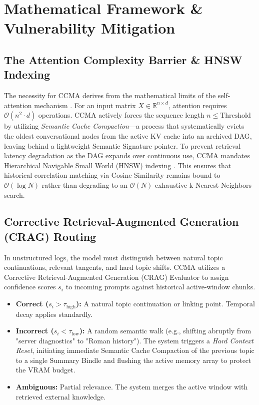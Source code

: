 \documentclass[11pt, a4paper]{article}
\begin{document}
	\section{Mathematical Framework \& Vulnerability Mitigation}
	
	\subsection{The Attention Complexity Barrier \& HNSW Indexing}
	The necessity for CCMA derives from the mathematical limits of the self-attention mechanism \cite{vaswani2017}. For an input matrix $X \in \mathbb{R}^{n \times d}$, attention requires $\mathcal{O}(n^2 \cdot d)$ operations. CCMA actively forces the sequence length $n \leq \text{Threshold}$ by utilizing \textit{Semantic Cache Compaction}—a process that systematically evicts the oldest conversational nodes from the active KV cache into an archived DAG, leaving behind a lightweight Semantic Signature pointer. To prevent retrieval latency degradation as the DAG expands over continuous use, CCMA mandates Hierarchical Navigable Small World (HNSW) indexing \cite{malkov2018hnsw}. This ensures that historical correlation matching via Cosine Similarity remains bound to $\mathcal{O}(\log N)$ rather than degrading to an $\mathcal{O}(N)$ exhaustive k-Nearest Neighbors search.
	
	\subsection{Corrective Retrieval-Augmented Generation (CRAG) Routing}
	In unstructured logs, the model must distinguish between natural topic continuations, relevant tangents, and hard topic shifts. CCMA utilizes a Corrective Retrieval-Augmented Generation (CRAG) Evaluator \cite{yan2024crag} to assign confidence scores $s_i$ to incoming prompts against historical active-window chunks.
	\begin{itemize}
		\item \textbf{Correct ($s_i > \tau_{\text{high}}$):} A natural topic continuation or linking point. Temporal decay applies standardly.
		\item \textbf{Incorrect ($s_i < \tau_{\text{low}}$):} A random semantic walk (e.g., shifting abruptly from "server diagnostics" to "Roman history"). The system triggers a \textit{Hard Context Reset}, initiating immediate Semantic Cache Compaction of the previous topic to a single Summary Bindle and flushing the active memory array to protect the VRAM budget.
		\item \textbf{Ambiguous:} Partial relevance. The system merges the active window with retrieved external knowledge.
	\end{itemize}
	
\end{document}

